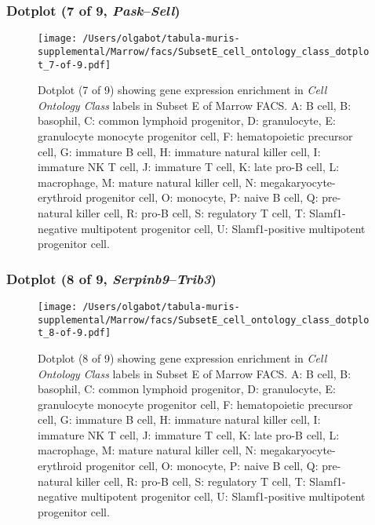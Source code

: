 \subsubsection{Dotplot (7 of 9, \emph{Pask}--\emph{Sell})}
\begin{figure}[h]
\centering
\texttt{[image: /Users/olgabot/tabula-muris-supplemental/Marrow/facs/SubsetE\_cell\_ontology\_class\_dotplot\_7-of-9.pdf]}

\caption{ Dotplot (7 of 9)  showing gene expression enrichment in \emph{Cell Ontology Class} labels in Subset E of Marrow FACS. A: B cell, B: basophil, C: common lymphoid progenitor, D: granulocyte, E: granulocyte monocyte progenitor cell, F: hematopoietic precursor cell, G: immature B cell, H: immature natural killer cell, I: immature NK T cell, J: immature T cell, K: late pro-B cell, L: macrophage, M: mature natural killer cell, N: megakaryocyte-erythroid progenitor cell, O: monocyte, P: naive B cell, Q: pre-natural killer cell, R: pro-B cell, S: regulatory T cell, T: Slamf1-negative multipotent progenitor cell, U: Slamf1-positive multipotent progenitor cell.}
\end{figure}


\clearpage

\subsubsection{Dotplot (8 of 9, \emph{Serpinb9}--\emph{Trib3})}
\begin{figure}[h]
\centering
\texttt{[image: /Users/olgabot/tabula-muris-supplemental/Marrow/facs/SubsetE\_cell\_ontology\_class\_dotplot\_8-of-9.pdf]}

\caption{ Dotplot (8 of 9)  showing gene expression enrichment in \emph{Cell Ontology Class} labels in Subset E of Marrow FACS. A: B cell, B: basophil, C: common lymphoid progenitor, D: granulocyte, E: granulocyte monocyte progenitor cell, F: hematopoietic precursor cell, G: immature B cell, H: immature natural killer cell, I: immature NK T cell, J: immature T cell, K: late pro-B cell, L: macrophage, M: mature natural killer cell, N: megakaryocyte-erythroid progenitor cell, O: monocyte, P: naive B cell, Q: pre-natural killer cell, R: pro-B cell, S: regulatory T cell, T: Slamf1-negative multipotent progenitor cell, U: Slamf1-positive multipotent progenitor cell.}
\end{figure}


\clearpage

